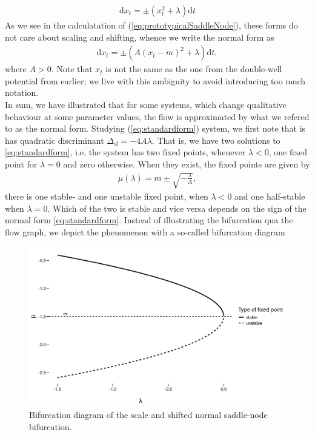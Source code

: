 \begin{align}
    \mathrm{d}x_t = \pm\left(x_t^2 + \lambda\right)\mathrm{d}t
\end{align} 
As we see in the calculatation of (\ref{eq:prototypicalSaddleNode}), these forms do not care about scaling and shifting, whence we write the normal form as
\begin{align}
    \mathrm{d}x_t = \pm\left(A\left(x_t - m\right)^2 + \lambda\right)\mathrm{d}t, \label{eq:standardform}
\end{align}
where $A>0$. Note that $x_t$ is not the same as the one from the double-well potential from earlier; we live with this ambiguity to avoid introducing too much notation.\\ In sum, we have illustrated that for some systems, which change qualitative behaviour at some parameter values, the flow is approximated by what we refered to as the normal form. Studying (\ref{eq:standardform}) system, we first note that is has quadratic discriminant $\Delta_{\mathrm{sf}} = -4A\lambda$. That is, we have two solutions to \ref{eq:standardform}, i.e. the system has two fixed points, whenever $\lambda<0$, one fixed point for $\lambda = 0$ and zero otherwise. When they exist, the fixed points are given by
\begin{align}
    \mu\left(\lambda\right) = m \pm \sqrt{-\frac{\lambda}{A}}, \label{eq:fixedPoint}
\end{align}
there is one stable- and one unstable fixed point, when $\lambda<0$ and one half-stable when $\lambda=0$. Which of the two is stable and vice versa depends on the sign of the normal form \ref{eq:standardform}. Instead of illustrating the bifurcation qua the flow graph, we depict the phenomenon with a so-called bifurcation diagram\\
\begin{figure}[h]
\begin{center}
    \includegraphics[scale = .4]{figures/bifurcation_diagram.jpeg}
    \caption{Bifurcation diagram of the scale and shifted normal saddle-node bifurcation.}
    \label{figure:bifurcationDiagram}
\end{center}
\end{figure}\\
